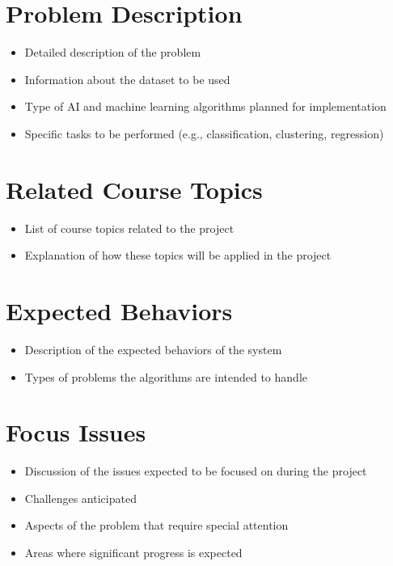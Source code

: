 \documentclass{article}
\begin{document}
\section{Problem Description}

\begin{itemize}
    \item Detailed description of the problem
    \item Information about the dataset to be used
    \item Type of AI and machine learning algorithms planned for implementation
    \item Specific tasks to be performed (e.g., classification, clustering,
          regression)
\end{itemize}

\section{Related Course Topics}

\begin{itemize}
    \item List of course topics related to the project
    \item Explanation of how these topics will be applied in the project
\end{itemize}

\section{Expected Behaviors}

\begin{itemize}
    \item Description of the expected behaviors of the system
    \item Types of problems the algorithms are intended to handle
\end{itemize}

\section{Focus Issues}

\begin{itemize}
    \item Discussion of the issues expected to be focused on during the project
    \item Challenges anticipated
    \item Aspects of the problem that require special attention
    \item Areas where significant progress is expected
\end{itemize}
\end{document}

